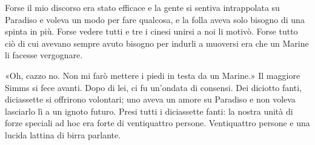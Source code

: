 Forse il mio discorso era stato efficace e la gente si sentiva
intrappolata su Paradiso e voleva un modo per fare qualcosa, e la folla
aveva solo bisogno di una spinta in più. Forse vedere tutti e tre i
cinesi unirsi a noi li motivò. Forse tutto ciò di cui avevano sempre
avuto bisogno per indurli a muoversi era che un Marine li facesse
vergognare.

«Oh, cazzo no. Non mi farò mettere i piedi in testa da un Marine.» Il
maggiore Simms si fece avanti. Dopo di lei, ci fu un'ondata di consensi.
Dei diciotto fanti, diciassette si offrirono volontari; uno aveva un
amore su Paradiso e non voleva lasciarlo lì a un ignoto futuro. Presi
tutti i diciassette fanti: la nostra unità di forze speciali ad hoc era
forte di ventiquattro persone. Ventiquattro persone e una lucida lattina
di birra parlante.